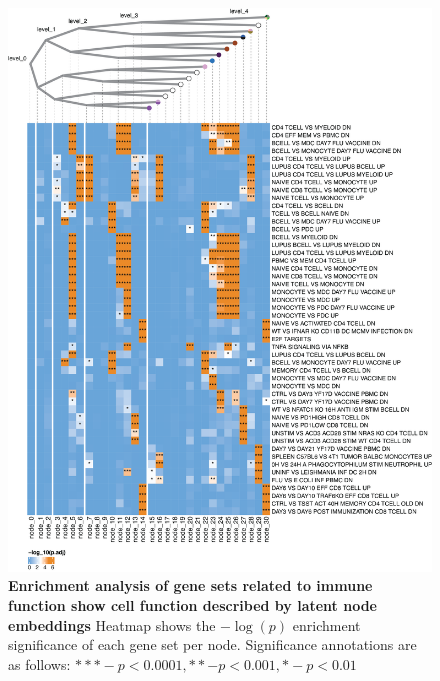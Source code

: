\begin{figure}
    \centering
    \includegraphics[scale=0.65]{Figures/immune_gsea.png}
    \caption{\textbf{Enrichment analysis of gene sets related to immune function show cell function described by latent node embeddings} Heatmap shows the $-\log(p)$ enrichment significance of each gene set per node. Significance annotations are as follows: $*** - p < 0.0001, ** - p < 0.001, * - p < 0.01$}
    \label{fig:immune_gsea}
\end{figure}

